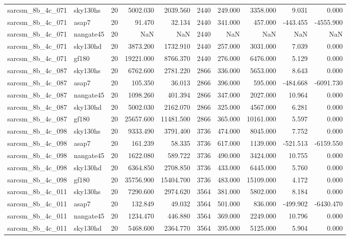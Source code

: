 \begin{longtable}{llrrrrrrrr}
sarcsm\_8b\_4c\_071 & sky130hs & 20 & 5002.030 & 2039.560 & 2440 & 249.000 & 3358.000 & 9.031 & 0.000 \\
sarcsm\_8b\_4c\_071 & asap7 & 20 & 91.470 & 32.134 & 2440 & 341.000 & 457.000 & -443.455 & -4555.900 \\
sarcsm\_8b\_4c\_071 & nangate45 & 20 & NaN & NaN & 2440 & NaN & NaN & NaN & NaN \\
sarcsm\_8b\_4c\_071 & sky130hd & 20 & 3873.200 & 1732.910 & 2440 & 257.000 & 3031.000 & 7.039 & 0.000 \\
sarcsm\_8b\_4c\_071 & gf180 & 20 & 19221.000 & 8766.370 & 2440 & 276.000 & 6476.000 & 5.129 & 0.000 \\
sarcsm\_8b\_4c\_087 & sky130hs & 20 & 6762.600 & 2781.220 & 2866 & 336.000 & 5653.000 & 8.643 & 0.000 \\
sarcsm\_8b\_4c\_087 & asap7 & 20 & 105.350 & 36.013 & 2866 & 396.000 & 595.000 & -484.668 & -6091.730 \\
sarcsm\_8b\_4c\_087 & nangate45 & 20 & 1098.260 & 401.394 & 2866 & 347.000 & 2027.000 & 10.964 & 0.000 \\
sarcsm\_8b\_4c\_087 & sky130hd & 20 & 5002.030 & 2162.070 & 2866 & 325.000 & 4567.000 & 6.281 & 0.000 \\
sarcsm\_8b\_4c\_087 & gf180 & 20 & 25657.600 & 11481.500 & 2866 & 365.000 & 10161.000 & 5.597 & 0.000 \\
sarcsm\_8b\_4c\_098 & sky130hs & 20 & 9333.490 & 3791.400 & 3736 & 474.000 & 8045.000 & 7.752 & 0.000 \\
sarcsm\_8b\_4c\_098 & asap7 & 20 & 161.239 & 58.335 & 3736 & 617.000 & 1139.000 & -521.513 & -6159.550 \\
sarcsm\_8b\_4c\_098 & nangate45 & 20 & 1622.080 & 589.722 & 3736 & 490.000 & 3424.000 & 10.755 & 0.000 \\
sarcsm\_8b\_4c\_098 & sky130hd & 20 & 6364.850 & 2708.850 & 3736 & 433.000 & 6445.000 & 5.760 & 0.000 \\
sarcsm\_8b\_4c\_098 & gf180 & 20 & 35756.900 & 15404.700 & 3736 & 483.000 & 15109.000 & 4.172 & 0.000 \\
sarcsm\_8b\_4c\_011 & sky130hs & 20 & 7290.600 & 2974.620 & 3564 & 381.000 & 5802.000 & 8.184 & 0.000 \\
sarcsm\_8b\_4c\_011 & asap7 & 20 & 132.849 & 49.032 & 3564 & 501.000 & 836.000 & -499.902 & -6430.470 \\
sarcsm\_8b\_4c\_011 & nangate45 & 20 & 1234.470 & 446.880 & 3564 & 369.000 & 2249.000 & 10.796 & 0.000 \\
sarcsm\_8b\_4c\_011 & sky130hd & 20 & 5468.600 & 2364.770 & 3564 & 395.000 & 5125.000 & 5.904 & 0.000 \\

\end{longtable}
